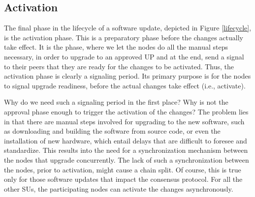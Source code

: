 \subsection{Activation}\label{se:activation}

The final phase in the lifecycle of a software update, depicted in Figure \ref{lifecycle}, is the activation phase. This is a preparatory phase before the changes actually take effect. It is the phase, where we let the nodes do all the manual steps necessary, in order to upgrade to an approved UP and at the end, send a signal to their peers that they are ready for the changes to be activated. Thus, the activation phase is clearly a signaling period. Its primary purpose is for the nodes to signal upgrade readiness, before the actual changes take effect (i.e., activate). 

Why do we need such a signaling period in the first place? Why is not the approval phase enough to trigger the activation of the changes? The problem lies in that there are manual steps involved for upgrading to the new software, such as downloading and building the software from source code, or even the installation of new hardware, which entail delays that are difficult to foresee and standardize. This results into the need for a synchronization mechanism between the nodes that upgrade concurrently. The lack of such a synchronization between the nodes, prior to activation, might cause a chain split. Of course, this is true only for those software updates that impact the consensus protocol. For all the other SUs, the participating nodes can activate the changes asynchronously. %



